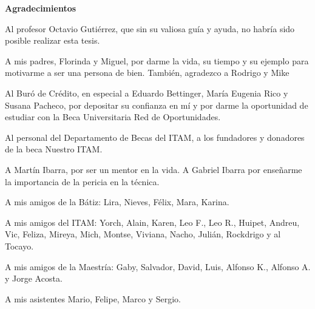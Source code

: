 \begin{center}
{\huge \bfseries Agradecimientos\\}
\end{center}

Al profesor Octavio Gutiérrez, que sin su valiosa guía y ayuda, no habría sido posible realizar esta tesis.

A mis padres, Florinda y Miguel, por darme la vida, su tiempo y su ejemplo para motivarme a ser una persona de bien. También, agradezco a Rodrigo y Mike 

Al Buró de Crédito, en especial a Eduardo Bettinger, María Eugenia Rico y Susana Pacheco, por depositar su confianza en mí y por darme la oportunidad de estudiar con la Beca Universitaria Red de Oportunidades.

Al personal del Departamento de Becas del ITAM, a los fundadores y donadores de la beca Nuestro ITAM.

A Martín Ibarra, por ser un mentor en la vida. A Gabriel Ibarra por enseñarme la importancia de la pericia en la técnica.

A mis amigos de la Bátiz: Lira, Nieves, Félix, Mara, Karina.

A mis amigos del ITAM: Yorch, Alain, Karen, Leo F., Leo R., Huipet, Andreu, Vic, Feliza, Mireya, Mich, Montse, Viviana, Nacho, Julián, Rockdrigo y al Tocayo.

A mis amigos de la Maestría: Gaby, Salvador, David, Luis, Alfonso K., Alfonso A. y Jorge Acosta.

A mis asistentes Mario, Felipe, Marco y Sergio.

\clearpage